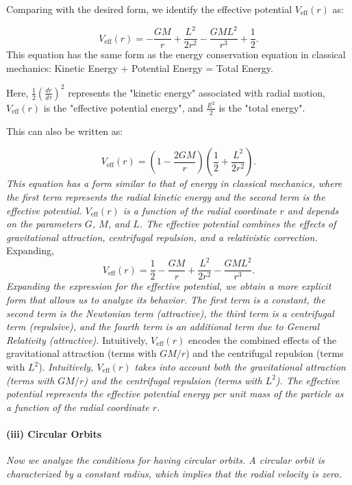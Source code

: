 \documentclass{article}
\begin{document}
Comparing with the desired form, we identify the effective potential $V_{\mathrm{eff}}(r)$ as:

\begin{equation*}
V_{\mathrm{eff}}(r) = -\frac{GM}{r} + \frac{L^2}{2r^2} - \frac{GML^2}{r^3} + \frac{1}{2}.
\end{equation*}
This equation has the same form as the energy conservation equation in classical mechanics:
Kinetic Energy + Potential Energy = Total Energy.

Here, $\frac{1}{2}\left(\frac{dr}{d\tau}\right)^2$ represents the "kinetic energy" associated with radial motion, $V_{\mathrm{eff}}(r)$ is the "effective potential energy", and $\frac{E^2}{2}$ is the "total energy".

This can also be written as:

\begin{equation*}
V_{\mathrm{eff}}(r) = \left(1 - \frac{2GM}{r}\right)\left(\frac{1}{2} + \frac{L^2}{2r^2}\right).
\end{equation*}
\textit{This equation has a form similar to that of energy in classical mechanics, where the first term represents the radial kinetic energy and the second term is the effective potential. $V_{\mathrm{eff}}(r)$ is a function of the radial coordinate $r$ and depends on the parameters $G$, $M$, and $L$. The effective potential combines the effects of gravitational attraction, centrifugal repulsion, and a relativistic correction.}
Expanding,
\begin{equation*}
V_{\mathrm{eff}}(r) = \frac{1}{2} - \frac{GM}{r} + \frac{L^2}{2r^2} - \frac{GM L^2}{r^3}.
\end{equation*}
\textit{Expanding the expression for the effective potential, we obtain a more explicit form that allows us to analyze its behavior. The first term is a constant, the second term is the Newtonian term (attractive), the third term is a centrifugal term (repulsive), and the fourth term is an additional term due to General Relativity (attractive).}
Intuitively, $V_{\mathrm{eff}}(r)$ encodes the combined effects of the gravitational attraction (terms with $GM/r$) and the centrifugal repulsion (terms with $L^2$).
\textit{Intuitively, $V_{\mathrm{eff}}(r)$ takes into account both the gravitational attraction (terms with $GM/r$) and the centrifugal repulsion (terms with $L^2$). The effective potential represents the effective potential energy per unit mass of the particle as a function of the radial coordinate $r$.}

\paragraph{(iii) Circular Orbits}
\textit{Now we analyze the conditions for having circular orbits. A circular orbit is characterized by a constant radius, which implies that the radial velocity is zero.}
\end{document}
